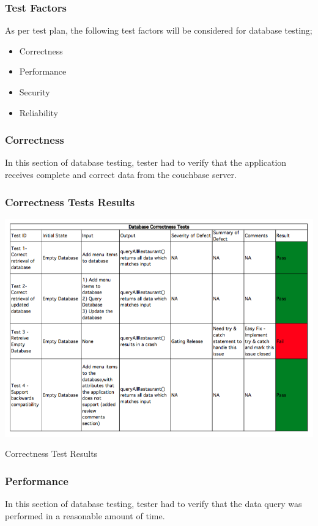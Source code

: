 \documentclass[12pt, titlepage]{article}
\begin{document}
\subsubsection{Test Factors}
As per test plan, the following test factors will be considered for database testing;
\begin{itemize}
 \item Correctness
 \item Performance
 \item Security
 \item Reliability
 \end{itemize}

\subsubsection{Correctness}
In this section of database testing, tester had to verify that the application receives complete and correct data from the couchbase server.
\subsubsection{Correctness Tests Results}
\begin{table}[h]
\includegraphics[width=\textwidth,height=\textheight,keepaspectratio]{correctness_tests.png}
  \caption{Correctness Test Results}
\end{table}

\subsubsection{Performance}
In this section of database testing, tester had to verify that the data query was performed in a reasonable amount of time. 
\end{document}
